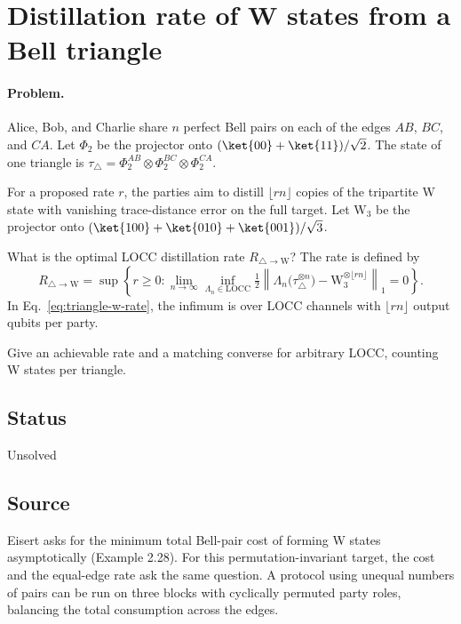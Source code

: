 \section{Distillation rate of W states from a Bell triangle}
\label{sec:op_da0450f40da1eea8}

\paragraph{Problem.}
Alice, Bob, and Charlie share $n$ perfect Bell pairs on each of the edges $AB$, $BC$, and $CA$. Let $\Phi_2$ be the projector onto $(\ket{00}+\ket{11})/\sqrt{2}$. The state of one triangle is $\tau_\triangle=\Phi_2^{AB}\otimes\Phi_2^{BC}\otimes\Phi_2^{CA}$.

For a proposed rate $r$, the parties aim to distill $\lfloor rn\rfloor$ copies of the tripartite W state with vanishing trace-distance error on the full target. Let $\mathrm{W}_3$ be the projector onto $(\ket{100}+\ket{010}+\ket{001})/\sqrt{3}$.

What is the optimal LOCC distillation rate $R_{\triangle\to\mathrm{W}}$? The rate is defined by
\begin{equation}
  R_{\triangle\to\mathrm{W}}=\sup\left\{r\geq 0:\lim_{n\to\infty}\inf_{\Lambda_n\in\mathrm{LOCC}}
  \tfrac12\left\lVert\Lambda_n\bigl(\tau_\triangle^{\otimes n}\bigr)
  -\mathrm{W}_3^{\otimes\lfloor rn\rfloor}\right\rVert_1=0\right\}.
  \label{eq:triangle-w-rate}
\end{equation}
In Eq.~\eqref{eq:triangle-w-rate}, the infimum is over LOCC channels with $\lfloor rn\rfloor$ output qubits per party.

Give an achievable rate and a matching converse for arbitrary LOCC, counting W states per triangle.

\subsection*{Status}

Unsolved

\subsection*{Source}

Eisert asks for the minimum total Bell-pair cost of forming W states asymptotically  (Example 2.28). For this permutation-invariant target, the cost and the equal-edge rate ask the same question. A protocol using unequal numbers of pairs can be run on three blocks with cyclically permuted party roles, balancing the total consumption across the edges.

